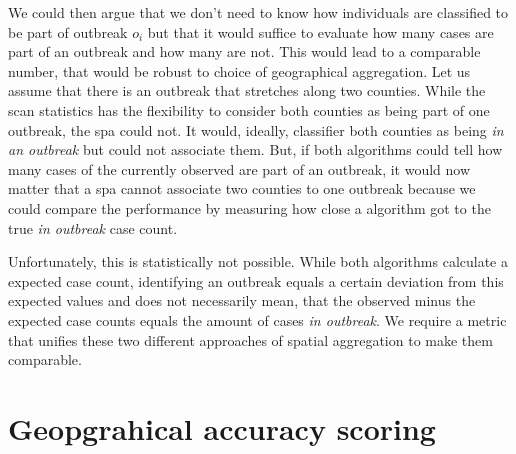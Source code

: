 \documentclass[a4paper, 12pt, one column]{article}
\begin{document}
We could then argue that we don't need to know how individuals are classified to be part of outbreak \(o_i\) but that it would suffice to evaluate how many cases are part of an outbreak and how many are not. This would lead to a comparable number, that would be robust to choice of geographical aggregation. Let us assume that there is an outbreak that stretches along two counties. While the scan statistics has the flexibility to consider both counties as being part of one outbreak, the \ac{spa} could not. It would, ideally, classifier both counties as being \emph{in an outbreak} but could not associate them. But, if both algorithms could tell how many cases of the currently observed are part of an outbreak, it would now matter that a \ac{spa} cannot associate two counties to one outbreak because we could compare the performance by measuring how close a algorithm got to the true \emph{in outbreak} case count.

Unfortunately, this is statistically not possible. While both algorithms calculate a expected case count, identifying an outbreak equals a certain deviation from this expected values and does not necessarily mean, that the observed minus the expected case counts equals the amount of cases \emph{in outbreak}. We require a metric that unifies these two different approaches of spatial aggregation to make them comparable.

\section{Geopgrahical accuracy scoring}

\end{document}
